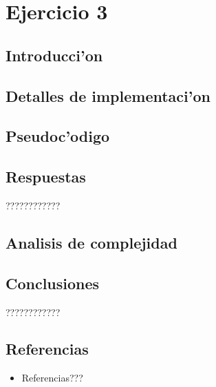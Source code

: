 \newpage
\section{Ejercicio 3}

\subsection{Introducci'on}


\subsection{Detalles de implementaci'on}


\subsection{Pseudoc'odigo}


\subsection{Respuestas}
????????????

\subsection{Analisis de complejidad}


\subsection{Conclusiones}
????????????

\subsection{Referencias}
\begin{itemize}
    \item Referencias???
\end{itemize}

